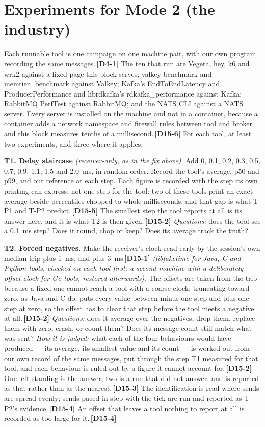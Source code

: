 \documentclass[11pt]{article}
\newcommand{\gl}[1]{{\color{soft}\itshape\small (#1)}}
\newcommand{\chgold}[1]{\,{\color{oldcol}\bfseries\footnotesize[#1]}}
\begin{document}
\section{Experiments for Mode 2 (the industry)}

Each runnable tool is one campaign on one machine pair, with our own program recording the same messages.\chgold{D4-1} The ten that run are Vegeta, hey, k6 and wrk2 against a fixed page this block serves; valkey-benchmark and memtier\_benchmark against Valkey; Kafka's EndToEndLatency and ProducerPerformance and librdkafka's rdkafka\_performance against Kafka; RabbitMQ PerfTest against RabbitMQ; and the NATS CLI against a NATS server. Every server is installed on the machine and not in a container, because a container adds a network namespace and firewall rules between tool and broker and this block measures tenths of a millisecond.\chgold{D15-6} For each tool, at least two experiments, and three where it applies:

\textbf{T1. Delay staircase} \gl{receiver-only, as in the fix above}. Add 0, 0.1, 0.2, 0.3, 0.5, 0.7, 0.9, 1.1, 1.5 and 2.0~ms, in random order. Record the tool's average, p50 and p99, and our reference at each step. Each figure is recorded with the step its own printing can express, not one step for the tool: two of these tools print an exact average beside percentiles chopped to whole milliseconds, and that gap is what T-P1 and T-P2 predict.\chgold{D15-5} The smallest step the tool reports at all is its answer here, and it is what T2 is then given.\chgold{D15-2} \emph{Questions:} does the tool see a 0.1~ms step? Does it round, chop or keep? Does its average track the truth?

\textbf{T2. Forced negatives.} Make the receiver's clock read early by the session's own median trip plus 1~ms, and plus 3~ms\chgold{D15-1} \gl{libfaketime for Java, C and Python tools, checked on each tool first; a second machine with a deliberately offset clock for Go tools, restored afterwards}. The offsets are taken from the trip because a fixed one cannot reach a tool with a coarse clock: truncating toward zero, as Java and C do, puts every value between minus one step and plus one step at zero, so the offset has to clear that step before the tool meets a negative at all.\chgold{D15-2} \emph{Questions:} does it average over the negatives, drop them, replace them with zero, crash, or count them? Does its message count still match what was sent? \emph{How it is judged:} what each of the four behaviours would have produced --- its average, its smallest value and its count --- is worked out from our own record of the same messages, put through the step T1 measured for that tool, and each behaviour is ruled out by a figure it cannot account for.\chgold{D15-2} One left standing is the answer; two is a run that did not answer, and is reported as that rather than as the nearest.\chgold{D15-3} The identification is read where sends are spread evenly; sends paced in step with the tick are run and reported as T-P2's evidence.\chgold{D15-4} An offset that leaves a tool nothing to report at all is recorded as too large for it.\chgold{D15-4}
\end{document}
